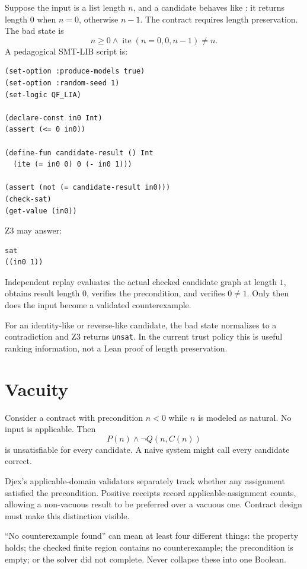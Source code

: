 \documentclass[10pt,letterpaper,oneside]{report}
\newcommand{\code}[1]{\texttt{\detokenize{#1}}}
\newcommand{\unsat}{\texttt{unsat}}
\begin{document}
Suppose the input is a list length $n$, and a candidate behaves like \code{tail}: it returns length $0$ when $n=0$, otherwise $n-1$. The contract requires length preservation. The bad state is
\[
  n\ge 0\land \operatorname{ite}(n=0,0,n-1)\ne n.
\]
A pedagogical SMT-LIB script is:

\begin{lstlisting}[language=SMTLib,caption={Counterexample search for a tail-like candidate under length preservation.}]
(set-option :produce-models true)
(set-option :random-seed 1)
(set-logic QF_LIA)

(declare-const in0 Int)
(assert (<= 0 in0))

(define-fun candidate-result () Int
  (ite (= in0 0) 0 (- in0 1)))

(assert (not (= candidate-result in0)))
(check-sat)
(get-value (in0))
\end{lstlisting}

Z3 may answer:

\begin{lstlisting}[language=SMTLib]
sat
((in0 1))
\end{lstlisting}

Independent replay evaluates the actual checked candidate graph at length $1$, obtains result length $0$, verifies the precondition, and verifies $0\ne1$. Only then does the input become a validated counterexample.

For an identity-like or reverse-like candidate, the bad state normalizes to a contradiction and Z3 returns \unsat. In the current trust policy this is useful ranking information, not a Lean proof of length preservation.

\section{Vacuity}

Consider a contract with precondition $n<0$ while $n$ is modeled as natural. No input is applicable. Then
\[
  P(n)\land\neg Q(n,C(n))
\]
is unsatisfiable for every candidate. A naive system might call every candidate correct.

Djex's applicable-domain validators separately track whether any assignment satisfied the precondition. Positive receipts record applicable-assignment counts, allowing a non-vacuous result to be preferred over a vacuous one. Contract design must make this distinction visible.

\begin{pitfall}
``No counterexample found'' can mean at least four different things: the property holds; the checked finite region contains no counterexample; the precondition is empty; or the solver did not complete. Never collapse these into one Boolean.
\end{pitfall}
\end{document}

